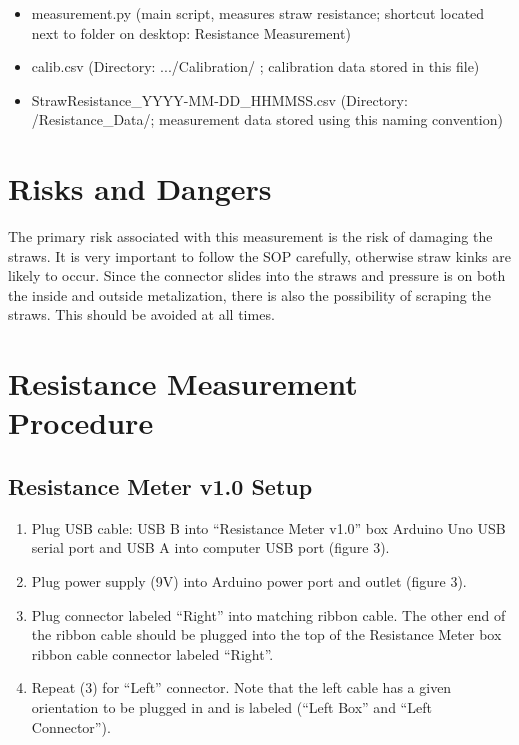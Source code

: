 \documentclass[letterpaper,12pt]{article}
\begin{document}
\begin{itemize}
	\item measurement.py (main script, measures straw resistance; shortcut located next to folder on desktop: Resistance Measurement)
	\item calib.csv (Directory: .../Calibration/ ; calibration data stored in this file)
	\item StrawResistance\_YYYY-MM-DD\_HHMMSS.csv (Directory: /Resistance\_Data/; measurement data stored using this naming convention)
\end{itemize}


\section{Risks and Dangers}
The primary risk associated with this measurement is the risk of damaging the straws. It is very important to follow the SOP carefully, otherwise straw kinks are likely to occur. Since the connector slides into the straws and pressure is on both the inside and outside metalization, there is also the possibility of scraping the straws. This should be avoided at all times.

\section{Resistance Measurement Procedure}
\subsection{Resistance Meter v1.0 Setup}
\begin{enumerate}
	\item Plug USB cable: USB B into “Resistance Meter v1.0” box Arduino Uno USB serial port and USB A into computer USB port (figure 3).
	\item Plug power supply (9V) into Arduino power port and outlet (figure 3).
	\item Plug connector labeled “Right” into matching ribbon cable. The other end of the ribbon cable should be plugged into the top of the Resistance Meter box ribbon cable connector labeled “Right”.
	\item Repeat (3) for “Left” connector. Note that the left cable has a given orientation to be plugged in and is labeled (“Left Box” and “Left Connector”).
\end{enumerate}
\end{document}
